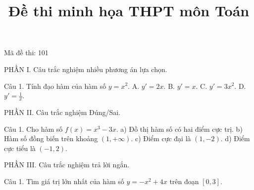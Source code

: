 \documentclass{article}
\title{Đề thi minh họa THPT môn Toán}
\begin{document}
\maketitle

Mã đề thi: 101

PHẦN I. Câu trắc nghiệm nhiều phương án lựa chọn.
\begin{question}
Câu 1. Tính đạo hàm của hàm số $y = x^2$.
A. $y' = 2x$.
B. $y' = x$.
C. $y' = 3x^2$.
D. $y' = \frac{1}{x}$.
\end{question}

PHẦN II. Câu trắc nghiệm Đúng/Sai.
\begin{question}
Câu 1. Cho hàm số $f(x) = x^3 - 3x$.
a) Đồ thị hàm số có hai điểm cực trị.
b) Hàm số đồng biến trên khoảng $(1, +\infty)$.
c) Điểm cực đại là $(1, -2)$.
d) Điểm cực tiểu là $(-1, 2)$.
\end{question}

PHẦN III. Câu trắc nghiệm trả lời ngắn.
\begin{question}
Câu 1. Tìm giá trị lớn nhất của hàm số $y = -x^2 + 4x$ trên đoạn $[0, 3]$.
\end{question}
\end{document}
